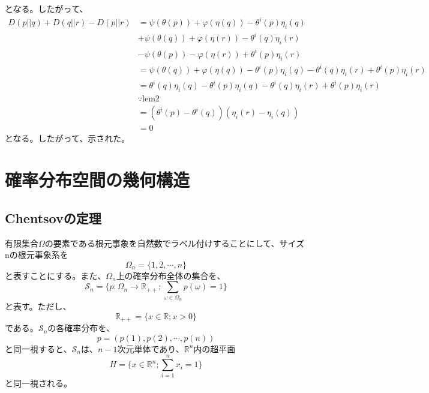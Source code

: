 \documentclass[a4paper,11pt]{jsarticle}
\numberwithin{equation}{section}
\begin{document}
となる。したがって、
\begin{align}
    D(p||q) + D(q||r) - D(p||r) &= \psi(\theta(p)) + \varphi(\eta(q)) - \theta^i(p)\eta_i(q) \\
    &+ \psi(\theta(q)) + \varphi(\eta(r)) - \theta^i(q)\eta_i(r) \\
    &- \psi(\theta(p)) - \varphi(\eta(r)) + \theta^i(p)\eta_i(r) \\
    &= \psi(\theta(q)) + \varphi(\eta(q)) - \theta^i(p)\eta_i(q) -\theta^i(q)\eta_i(r) + \theta^i(p)\eta_i(r) \\
    &= \theta^i(q)\eta_i(q) - \theta^i(p)\eta_i(q) -\theta^i(q)\eta_i(r) + \theta^i(p)\eta_i(r) \\
    &\because \text{lem2} \\
    &= (\theta^i(p)-\theta^i(q))(\eta_i(r) - \eta_i(q))\\
    &= 0
\end{align}
となる。したがって、示された。\hfill\qedsymbol
\newpage

\section{確率分布空間の幾何構造}
\subsection{Chentsovの定理}
有限集合$\Omega$の要素である根元事象を自然数でラベル付けすることにして、サイズnの根元事象系を
\begin{equation}
    \Omega_n = \{1,2,\cdots,n\}
\end{equation}
と表すことにする。また、$\Omega_n$上の確率分布全体の集合を、
\begin{equation}
    \mathcal{S}_n = \{p: \Omega_n \to \mathbb{R}_{++}; \sum_{\omega \in \Omega_n} p(\omega) = 1\}
\end{equation}
と表す。ただし、
\begin{equation}
    \mathbb{R}_{++} = \{x \in \mathbb{R}; x > 0\}
\end{equation}
である。$\mathcal{S}_n$の各確率分布を、
\begin{equation}
    p = (p(1),p(2),\cdots,p(n))
\end{equation}
と同一視すると、$\mathcal{S}_n$は、$n-1$次元単体であり、$\mathbb{R}^n$内の超平面
\begin{equation}
    H = \{x \in \mathbb{R}^n; \sum_{i=1}^{n} x_i = 1\}
\end{equation}
と同一視される。\\
\end{document}
